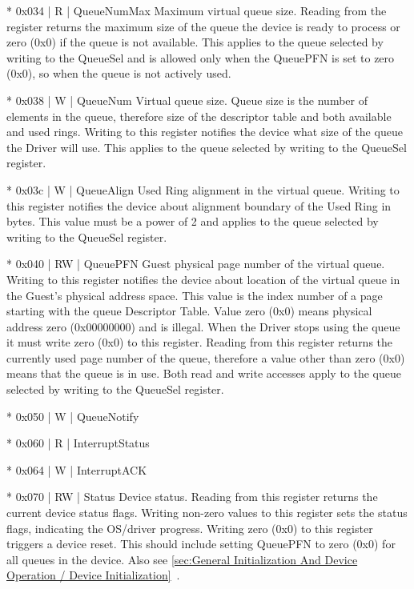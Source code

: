 * 0x034 | R | QueueNumMax
  Maximum virtual queue size.
  Reading from the register returns the maximum size of the queue
  the device is ready to process or zero (0x0) if the queue is not
  available. This applies to the queue selected by writing to the
  QueueSel and is allowed only when the QueuePFN is set to zero
  (0x0), so when the queue is not actively used.

* 0x038 | W | QueueNum
  Virtual queue size.
  Queue size is the number of elements in the queue, therefore size
  of the descriptor table and both available and used rings.
  Writing to this register notifies the device what size of the
  queue the Driver will use. This applies to the queue selected by
  writing to the QueueSel register.

* 0x03c | W | QueueAlign
  Used Ring alignment in the virtual queue.
  Writing to this register notifies the device about alignment
  boundary of the Used Ring in bytes. This value must be a power
  of 2 and applies to the queue selected by writing to the QueueSel
  register.

* 0x040 | RW | QueuePFN
  Guest physical page number of the virtual queue.
  Writing to this register notifies the device about location of the
  virtual queue in the Guest's physical address space. This value
  is the index number of a page starting with the queue
  Descriptor Table. Value zero (0x0) means physical address zero
  (0x00000000) and is illegal. When the Driver stops using the
  queue it must write zero (0x0) to this register.
  Reading from this register returns the currently used page
  number of the queue, therefore a value other than zero (0x0)
  means that the queue is in use.
  Both read and write accesses apply to the queue selected by
  writing to the QueueSel register.

* 0x050 | W | QueueNotify

* 0x060 | R | InterruptStatus

* 0x064 | W | InterruptACK

* 0x070 | RW | Status
  Device status.
  Reading from this register returns the current device status
  flags.
  Writing non-zero values to this register sets the status flags,
  indicating the OS/driver progress. Writing zero (0x0) to this
  register triggers a device reset. This should include
  setting QueuePFN to zero (0x0) for all queues in the device.
  Also see \ref{sec:General Initialization And Device Operation / Device Initialization}~.

